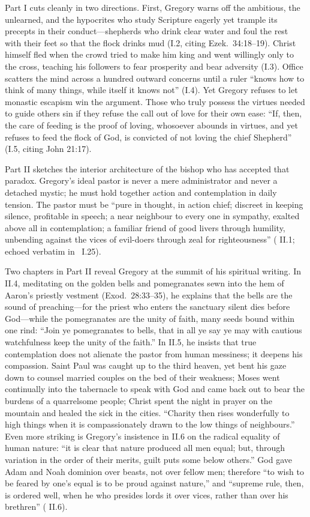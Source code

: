 Part I cuts cleanly in two directions. First, Gregory warns off the ambitious,
the unlearned, and the hypocrites who study Scripture eagerly yet trample its
precepts in their conduct---shepherds who drink clear water and foul the rest
with their feet so that the flock drinks mud (I.2, citing Ezek.\ 34:18--19).
Christ himself fled when the crowd tried to make him king and went willingly
only to the cross, teaching his followers to fear prosperity and bear adversity
(I.3). Office scatters the mind across a hundred outward concerns until a ruler
``knows how to think of many things, while itself it knows not'' (I.4). Yet
Gregory refuses to let monastic escapism win the argument. Those who truly
possess the virtues needed to guide others sin if they refuse the call out of
love for their own ease: ``If, then, the care of feeding is the proof of
loving, whosoever abounds in virtues, and yet refuses to feed the flock of God,
is convicted of not loving the chief Shepherd'' (I.5, citing John 21:17).

Part II sketches the interior architecture of the bishop who has accepted that
paradox. Gregory's ideal pastor is never a mere administrator and never a
detached mystic; he must hold together action and contemplation in daily
tension. The pastor must be ``pure in thought, in action chief; discreet in
keeping silence, profitable in speech; a near neighbour to every one in
sympathy, exalted above all in contemplation; a familiar friend of good livers
through humility, unbending against the vices of evil-doers through zeal for
righteousness'' ( II.1; echoed verbatim in \
I.25).

Two chapters in Part II reveal Gregory at the summit of his spiritual writing.
In II.4, meditating on the golden bells and pomegranates sewn into the hem of
Aaron's priestly vestment (Exod.\ 28:33--35), he explains that the bells are
the sound of preaching---for the priest who enters the sanctuary silent dies
before God---while the pomegranates are the unity of faith, many seeds bound
within one rind: ``Join ye pomegranates to bells, that in all ye say ye may
with cautious watchfulness keep the unity of the faith.'' In II.5, he insists
that true contemplation does not alienate the pastor from human messiness; it
deepens his compassion. Saint Paul was caught up to the third heaven, yet bent
his gaze down to counsel married couples on the bed of their weakness; Moses
went continually into the tabernacle to speak with God and came back out to
bear the burdens of a quarrelsome people; Christ spent the night in prayer on
the mountain and healed the sick in the cities. ``Charity then rises
wonderfully to high things when it is compassionately drawn to the low things
of neighbours.'' Even more striking is Gregory's insistence in II.6 on the
radical equality of human nature: ``it is clear that nature produced all men
equal; but, through variation in the order of their merits, guilt puts some
below others.'' God gave Adam and Noah dominion over beasts, not over fellow
men; therefore ``to wish to be feared by one's equal is to be proud against
nature,'' and ``supreme rule, then, is ordered well, when he who presides lords
it over vices, rather than over his brethren'' (\work{Regula Pastoralis} II.6).

